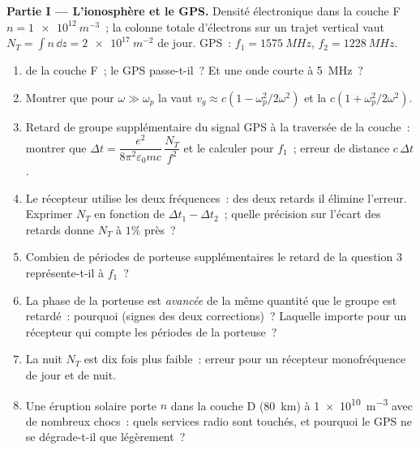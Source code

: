 \begin{problem}
\label{pb:b2:waves-in-media:1}

\medskip
\noindent\textbf{Partie I --- L'ionosphère et le GPS.}
Densité électronique dans la couche F $n = \qty{1e12}{m^{-3}}$~; la colonne totale
d'électrons sur un trajet vertical vaut $N_T = \int n\,\dd z = \qty{2e17}{m^{-2}}$ de
jour. GPS~: $f_1 = \qty{1575}{MHz}$, $f_2 = \qty{1228}{MHz}$.
\begin{enumerate}
  \item {} de la couche F~; le GPS passe-t-il~? Et une
        onde courte à \qty{5}{MHz}~?
  \item Montrer que pour $\omega \gg \omega_p$ la  vaut $v_g \approx c(1 -
        \omega_p^2/2\omega^2)$ et la  $c(1 + \omega_p^2/2\omega^2)$.
  \item Retard de groupe supplémentaire du signal GPS à la traversée de la couche~: montrer que
        $\Delta t = \dfrac{e^2}{8\pi^2\varepsilon_0mc}\,\dfrac{N_T}{f^2}$ et le calculer pour
        $f_1$~; erreur de distance $c\,\Delta t$.
  \item Le récepteur utilise les deux fréquences~: des deux retards il
        élimine l'erreur. Exprimer $N_T$ en fonction de $\Delta t_1 - \Delta t_2$~;
        quelle précision sur l'écart des retards donne $N_T$ à $1\%$ près~?
  \item Combien de périodes de porteuse supplémentaires le retard de la question 3
        représente-t-il à $f_1$~?
  \item La phase de la porteuse est \emph{avancée} de la même
        quantité que le groupe est retardé~: pourquoi (signes des deux
        corrections)~? Laquelle importe pour un récepteur qui compte les
        périodes de la porteuse~?
  \item La nuit $N_T$ est dix fois plus faible~: erreur pour un récepteur
        monofréquence de jour et de nuit.
  \item Une éruption solaire porte $n$ dans la couche D (\qty{80}{km}) à
        \qty{1e10}{m^{-3}} avec de nombreux chocs~: quels services radio sont
        touchés, et pourquoi le GPS ne se dégrade-t-il que légèrement~?
\end{enumerate}


\end{problem}
